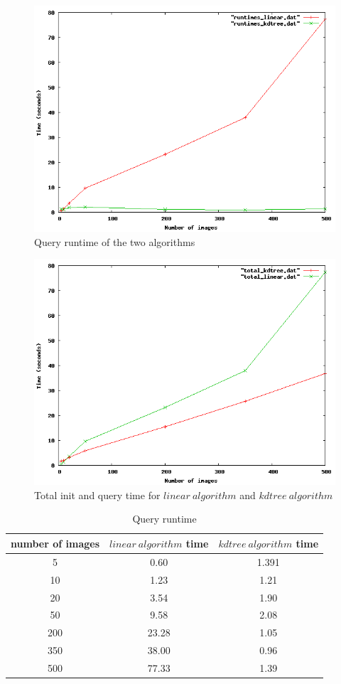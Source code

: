 \begin{figure}[ht!]
\centering
\includegraphics[width=.7\linewidth]{images/runtimesBasic.png}
\caption{Query runtime of the two algorithms}
\label{fig:runtimesBasic}
\end{figure}

\begin{figure}[ht!]
\centering
\includegraphics[width=.7\linewidth]{images/totalRuntimes.png}
\caption{Total init and query time for $linear\ algorithm$ and $kdtree\ algorithm$}
\label{fig:totalRuntimes}
\end{figure}

\begin{table}
\centering
\begin{tabular} {c | c | c}
	number of images & $linear\ algorithm$ time & $kdtree\ algorithm$ time \\
	\hline
	5 & 0.60 & 1.391 \\
	10 & 1.23 & 1.21 \\
	20 & 3.54 & 1.90 \\
	50 & 9.58 & 2.08 \\
	200 & 23.28 & 1.05 \\
	350 & 38.00 & 0.96 \\
	500 & 77.33 & 1.39 \\
\end{tabular}
\caption{Query runtime}
\end{table}


